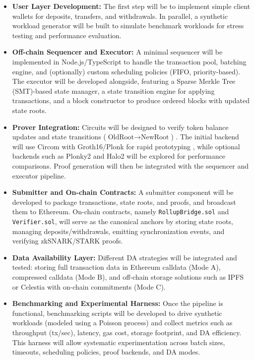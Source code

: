 \begin{itemize}

\item \textbf{User Layer Development:} The first step will be to implement simple client wallets for deposits, transfers, and withdrawals. In parallel, a synthetic workload generator will be built to simulate benchmark workloads for stress testing and performance evaluation.

\item \textbf{Off-chain Sequencer and Executor:} A minimal sequencer will be implemented in Node.js/TypeScript to handle the transaction pool, batching engine, and (optionally) custom scheduling policies (FIFO, priority-based). The executor will be developed alongside, featuring a Sparse Merkle Tree (SMT)-based state manager, a state transition engine for applying transactions, and a block constructor to produce ordered blocks with updated state roots.

\item \textbf{Prover Integration:} Circuits will be designed to verify token balance updates and state transitions ($\text{OldRoot} \rightarrow \text{NewRoot}$) \cite{sheybani2025zero}. The initial backend will use Circom with Groth16/Plonk for rapid prototyping \cite{iden3_circom, sui_groth16, polygon_plonky2}, while optional backends such as Plonky2 and Halo2 \cite{polygon_plonky2, zcash_halo2} will be explored for performance comparisons. Proof generation will then be integrated with the sequencer and executor pipeline.

\item \textbf{Submitter and On-chain Contracts:} A submitter component will be developed to package transactions, state roots, and proofs, and broadcast them to Ethereum. On-chain contracts, namely \texttt{RollupBridge.sol} and \texttt{Verifier.sol}, will serve as the canonical anchors by storing state roots, managing deposits/withdrawals, emitting synchronization events, and verifying zkSNARK/STARK proofs.

\item \textbf{Data Availability Layer:} Different DA strategies will be integrated and tested: storing full transaction data in Ethereum calldata (Mode A), compressed calldata (Mode B), and off-chain storage solutions such as IPFS \cite{protocol_ipfs} or Celestia \cite{celestia_how} with on-chain commitments (Mode C).

\item \textbf{Benchmarking and Experimental Harness:} Once the pipeline is functional, benchmarking scripts will be developed to drive synthetic workloads (modeled using a Poisson process) and collect metrics such as throughput (tx/sec), latency, gas cost, storage footprint, and DA efficiency. This harness will allow systematic experimentation across batch sizes, timeouts, scheduling policies, proof backends, and DA modes.


\end{itemize}
